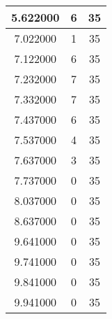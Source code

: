 \begin{longtable}[htbp]{|c|c|c|}
5.622000 & 6 & 35 \\ \hline
7.022000 & 1 & 35 \\ \hline
7.122000 & 6 & 35 \\ \hline
7.232000 & 7 & 35 \\ \hline
7.332000 & 7 & 35 \\ \hline
7.437000 & 6 & 35 \\ \hline
7.537000 & 4 & 35 \\ \hline
7.637000 & 3 & 35 \\ \hline
7.737000 & 0 & 35 \\ \hline
8.037000 & 0 & 35 \\ \hline
8.637000 & 0 & 35 \\ \hline
9.641000 & 0 & 35 \\ \hline
9.741000 & 0 & 35 \\ \hline
9.841000 & 0 & 35 \\ \hline
9.941000 & 0 & 35 \\ \hline
\end{longtable}
